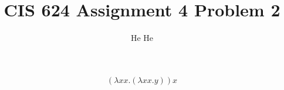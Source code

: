 \documentclass[12pt,letter]{article}
\numberwithin{equation}{section}
\begin{document}
\title{CIS 624 Assignment 4 Problem 2}
\author{He He}
\maketitle
$$(\lambda xx.(\lambda xx.y))x $$
\end{document}
